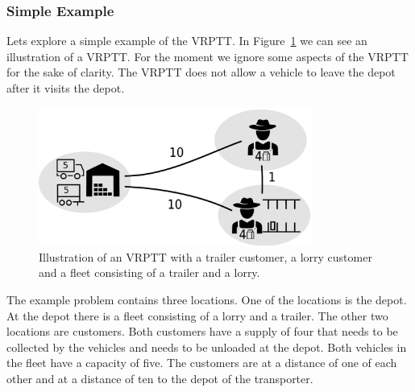
\subsubsection{Simple Example}

\label{sec:simple-example}

Lets explore a simple example of the VRPTT.
In Figure~\ref{fig:trivial} we can see an illustration of a VRPTT.
For the moment we ignore some aspects of the VRPTT for the sake of clarity.
The VRPTT does not allow a vehicle to leave the depot after it visits the depot.


\begin{figure}[!ht]
  \centering
    \includegraphics[width=0.8\textwidth]{img/trivial_example_withcapacity_v2.pdf}
  \caption{Illustration of an VRPTT with a trailer customer, a lorry customer and a fleet consisting of a trailer and a lorry.}
  \label{fig:trivial}
\end{figure}




The example problem contains three locations.
One of the locations is the depot.
At the depot there is a fleet consisting of a lorry and a trailer.
The other two locations are customers.
Both customers have a supply of four that needs to be collected by the vehicles and needs to be unloaded at the depot.
Both vehicles in the fleet have a capacity of five.
The customers are at a distance of one of each other and at a distance of ten to the depot of the transporter.\\

